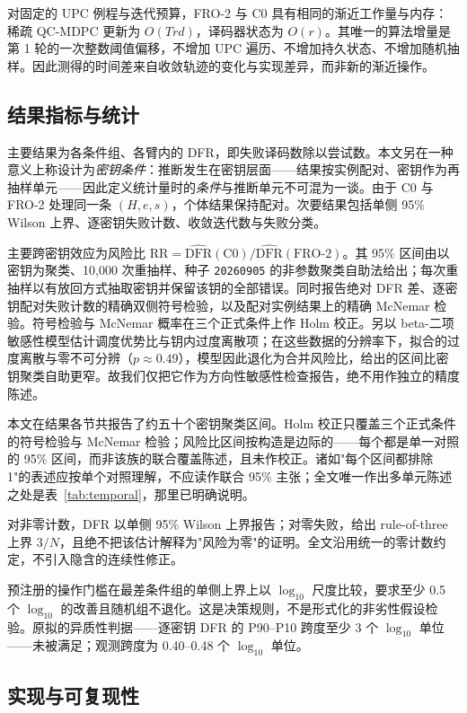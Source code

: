 \documentclass[UTF8,a4paper,10pt,twocolumn]{ctexart}
\begin{document}
对固定的 UPC 例程与迭代预算，FRO-2 与 C0 具有相同的渐近工作量与内存：稀疏 QC-MDPC 更新为 $O(Trd)$，译码器状态为 $O(r)$。其唯一的算法增量是第 1 轮的一次整数阈值偏移，不增加 UPC 遍历、不增加持久状态、不增加随机抽样。因此测得的时间差来自收敛轨迹的变化与实现差异，而非新的渐近操作。

\subsection{结果指标与统计}

主要结果为各条件组、各臂内的 DFR，即失败译码数除以尝试数。本文另在一种意义上称设计为\emph{密钥条件}：推断发生在密钥层面——结果按实例配对、密钥作为再抽样单元——因此定义统计量时的\emph{条件}与推断单元不可混为一谈。由于 C0 与 FRO-2 处理同一条 $(H,e,s)$，个体结果保持配对。次要结果包括单侧 95\% Wilson 上界、逐密钥失败计数、收敛迭代数与失败分类。

主要跨密钥效应为风险比 $\mathrm{RR}=\widehat{\mathrm{DFR}}(\mathrm{C0})/\widehat{\mathrm{DFR}}(\mathrm{FRO\text{-}2})$。其 95\% 区间由以密钥为聚类、10{,}000 次重抽样、种子 \texttt{20260905} 的非参数聚类自助法给出；每次重抽样以有放回方式抽取密钥并保留该钥的全部错误。同时报告绝对 DFR 差、逐密钥配对失败计数的精确双侧符号检验，以及配对实例结果上的精确 McNemar 检验。符号检验与 McNemar 概率在三个正式条件上作 Holm 校正。另以 beta-二项敏感性模型估计调度优势比与钥内过度离散项；在这些数据的分辨率下，拟合的过度离散与零不可分辨（$p\approx0.49$），模型因此退化为合并风险比，给出的区间比密钥聚类自助更窄。故我们仅把它作为方向性敏感性检查报告，绝不用作独立的精度陈述。

本文在结果各节共报告了约五十个密钥聚类区间。Holm 校正只覆盖三个正式条件的符号检验与 McNemar 检验；风险比区间按构造是边际的——每个都是单一对照的 95\% 区间，而非该族的联合覆盖陈述，且未作校正。诸如"每个区间都排除 1"的表述应按单个对照理解，不应读作联合 95\% 主张；全文唯一作出多单元陈述之处是表~\ref{tab:temporal}，那里已明确说明。

对非零计数，DFR 以单侧 95\% Wilson 上界报告；对零失败，给出 rule-of-three 上界 $3/N$，且绝不把该估计解释为"风险为零"的证明。全文沿用统一的零计数约定，不引入隐含的连续性修正。

预注册的操作门槛在最差条件组的单侧上界上以 $\log_{10}$ 尺度比较，要求至少 0.5 个 $\log_{10}$ 的改善且随机组不退化。这是决策规则，不是形式化的非劣性假设检验。原拟的异质性判据——逐密钥 DFR 的 P90--P10 跨度至少 3 个 $\log_{10}$ 单位——未被满足；观测跨度为 0.40--0.48 个 $\log_{10}$ 单位。

\subsection{实现与可复现性}
\end{document}
